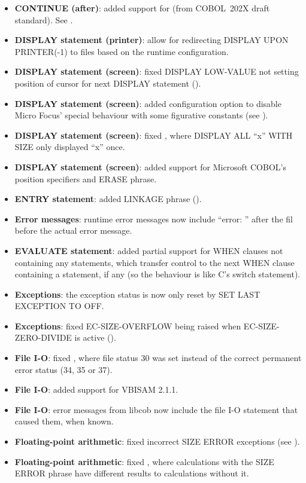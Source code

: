 \begin{itemize}
\item \textbf{CONTINUE (after)}: added support for (from COBOL~202X draft standard). See .
\item \textbf{DISPLAY statement (printer)}: allow for redirecting DISPLAY UPON PRINTER(-1) to files based on the runtime configuration.
\item \textbf{DISPLAY statement (screen)}: fixed DISPLAY LOW-VALUE not setting position of cursor for next DISPLAY statement ().
\item \textbf{DISPLAY statement (screen)}: added configuration option to disable Micro Focus' special behaviour with some figurative constants (see ).
\item \textbf{DISPLAY statement (screen)}: fixed , where DISPLAY ALL ``x'' WITH SIZE only displayed ``x'' once.
\item \textbf{DISPLAY statement (screen)}: added support for Microsoft COBOL's position specifiers and ERASE phrase.
\item \textbf{ENTRY statement}: added LINKAGE phrase ().
\item \textbf{Error messages}: runtime error messages now include ``error: '' after the fil before the actual error message.
\item \textbf{EVALUATE statement}: added partial support for WHEN clauses not containing any statements, which transfer control to the next WHEN clause containing a statement, if any (so the behaviour is like C's switch statement).
\item \textbf{Exceptions}: the exception status is now only reset by SET LAST EXCEPTION TO OFF.
\item \textbf{Exceptions}: fixed EC-SIZE-OVERFLOW being raised when EC-SIZE-ZERO-DIVIDE is active ().
\item \textbf{File I-O}: fixed , where file status 30 was set instead of the correct permanent error status (34, 35 or 37).
\item \textbf{File I-O}: added support for VBISAM 2.1.1.
\item \textbf{File I-O}: error messages from libcob now include the file I-O statement that caused them, when known.
\item \textbf{Floating-point arithmetic}: fixed incorrect SIZE ERROR exceptions (see ).
\item \textbf{Floating-point arithmetic}: fixed , where calculations with the SIZE ERROR phrase have different results to calculations without it.

\end{itemize}
